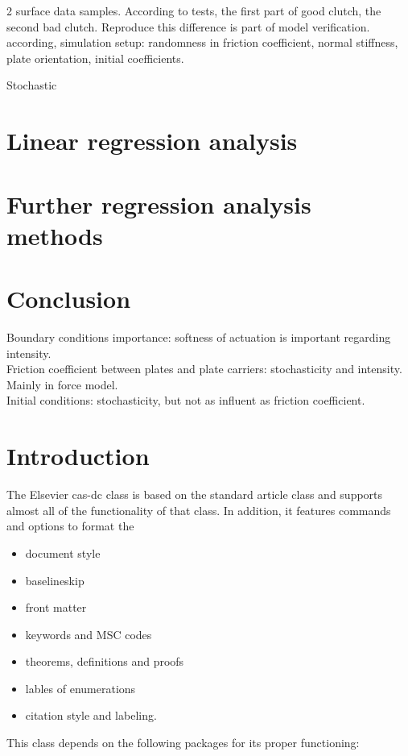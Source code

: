 \documentclass[a4paper,fleqn]{cas-dc}
\begin{document}
2 surface data samples. According to tests, the first part of good clutch, the second bad clutch. Reproduce this difference is part of model verification. \\

according, simulation setup: 
randomness in friction coefficient, normal stiffness, plate orientation, initial coefficients.

Stochastic 

\section{Linear regression analysis}
\section{Further regression analysis methods}

\section{Conclusion}
Boundary conditions importance: softness of actuation is important regarding intensity. \\
Friction coefficient between plates and plate carriers: stochasticity and intensity. Mainly in force model.  \\
Initial conditions: stochasticity, but not as influent as friction coefficient. \\


\section{Introduction}

The Elsevier cas-dc class is based on the
standard article class and supports almost all of the functionality of
that class. In addition, it features commands and options to format the
\begin{itemize} \item document style \item baselineskip \item front
matter \item keywords and MSC codes \item theorems, definitions and
proofs \item lables of enumerations \item citation style and labeling.
\end{itemize}

This class depends on the following packages
for its proper functioning:
\end{document}
